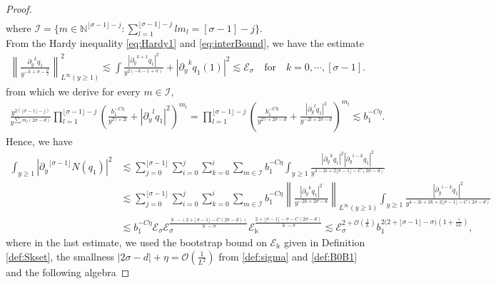 \documentclass[11pt]{aims}
\theoremstyle{definition}
\numberwithin{equation}{section}
\begin{document}
\begin{proof}
\begin{align*}
\end{align*}
where $ \mathcal{I} = \{m \in \mathbb{N}^{\lfloor\sigma -1 \rfloor - j}: \sum_{l = 1}^{\lfloor\sigma -1 \rfloor - j} lm_l = [\sigma - 1] - j\}$. \\
From the Hardy inequality \eqref{eq:Hardy1} and \eqref{eq:interBound}, we have the estimate
\begin{align}
\left\|\frac{{\partial_y}^k q_1}{y^{-k + \sigma - \frac{d}{2}}} \right\|^2_{L^\infty(y \geq 1)} \lesssim \int \frac{|{\partial_y}^{k + 1}q_1|^2}{y^{2(-k - 1 + \sigma)}} + |{\partial_y}^k q_1(1)|^2\lesssim {\mathscr{E}}_\sigma \quad \text{for} \quad k = 0, \cdots, [\sigma - 1].  \label{eq:Hardy4sigma}
\end{align} 
from which we derive for every $m \in \mathcal{I}$, 
\begin{align*}
\frac{y^{2(\lfloor\sigma -1 \rfloor - j)}}{y^{\sum_l m_l (2\sigma  - d)}}\prod_{l = 1}^{\lfloor\sigma -1 \rfloor - j} \left(\frac{b_1^{-C\eta}}{y^{2\gamma + 2l}} + |{\partial_y}^l q_1|^2\right)^{m_l} = \prod_{l = 1}^{\lfloor\sigma -1 \rfloor - j} \left(\frac{b_1^{-C\eta}}{y^{2\gamma + 2\sigma - d}} + \frac{|{\partial_y}^l q_1|^2}{y^{-2l + 2\sigma - d}} \right)^{m_l} \lesssim b_1^{-C\eta}.
\end{align*}
Hence, we have
\begin{align*}
\int_{y \geq 1}|{\partial_y}^{\lfloor\sigma -1 \rfloor} N(q_1)|^2  &\lesssim \sum_{j = 0}^{\lfloor\sigma -1 \rfloor} \sum_{i = 0}^j \sum_{k = 0}^i \sum_{m \in \mathcal{I}} b_1^{-C\eta}\int_{y \geq 1} \frac{|{\partial_y}^k q_1|^2 |{\partial_y}^{i - k}q_1|^2}{y^{4  - 2i + 2\lfloor\sigma -1 \rfloor - C(2\sigma - d)}}\\
 &\lesssim \sum_{j = 0}^{\lfloor\sigma -1 \rfloor} \sum_{i = 0}^j \sum_{k = 0}^i \sum_{m \in \mathcal{I}} b_1^{-C\eta} \left\|\frac{|{\partial_y}^k q_1|^2}{y^{-2k + 2\sigma - d }} \right\|_{L^\infty(y \geq 1)} \int_{y \geq 1} \frac{|{\partial_y}^{i - k}q_1|^2}{y^{4  - 2i + 2k + 2\lfloor\sigma -1 \rfloor - C(2\sigma - d)}}\\
 & \lesssim b_1^{-C\eta}{\mathscr{E}}_\sigma {\mathscr{E}}_\sigma^{\frac{\Bbbk - (2 + \lfloor\sigma -1 \rfloor - C(2\sigma - d))}{\Bbbk - \sigma}} {\mathscr{E}}_\Bbbk^{\frac{2 + \lfloor\sigma -1 \rfloor - \sigma - C(2\sigma - d)}{\Bbbk - \sigma}} \lesssim {\mathscr{E}}_\sigma^{2 + {\mathcal{O}}\left(\frac{1}{L}\right)}b_1^{2 \big(2 + \lfloor\sigma -1 \rfloor - \sigma\big)\left(1 + \frac{\gamma}{2L}\right)},
\end{align*}
where in the last estimate, we used the bootstrap bound on ${\mathscr{E}}_\Bbbk$ given in Definition \eqref{def:Skset}, the smallness $|2\sigma - d| + \eta = {\mathcal{O}}\left(\frac{1}{L^2}\right)$ from \eqref{def:sigma} and \eqref{def:B0B1} and the following algebra

\end{proof}
\end{document}
